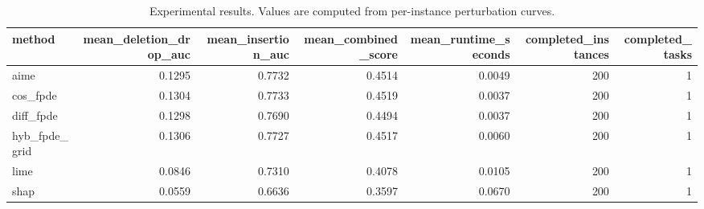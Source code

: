 \begin{table}[t]
\caption{Experimental results. Values are computed from per-instance perturbation curves.}
\label{tab:main_results_computed}
\centering
\begin{tabular}{lrrrrrr}
\toprule
method & mean\_deletion\_drop\_auc & mean\_insertion\_auc & mean\_combined\_score & mean\_runtime\_seconds & completed\_instances & completed\_tasks \\
\midrule
aime & 0.1295 & 0.7732 & 0.4514 & 0.0049 & 200 & 1 \\
cos\_fpde & 0.1304 & 0.7733 & 0.4519 & 0.0037 & 200 & 1 \\
diff\_fpde & 0.1298 & 0.7690 & 0.4494 & 0.0037 & 200 & 1 \\
hyb\_fpde\_grid & 0.1306 & 0.7727 & 0.4517 & 0.0060 & 200 & 1 \\
lime & 0.0846 & 0.7310 & 0.4078 & 0.0105 & 200 & 1 \\
shap & 0.0559 & 0.6636 & 0.3597 & 0.0670 & 200 & 1 \\
\bottomrule
\end{tabular}

\end{table}
